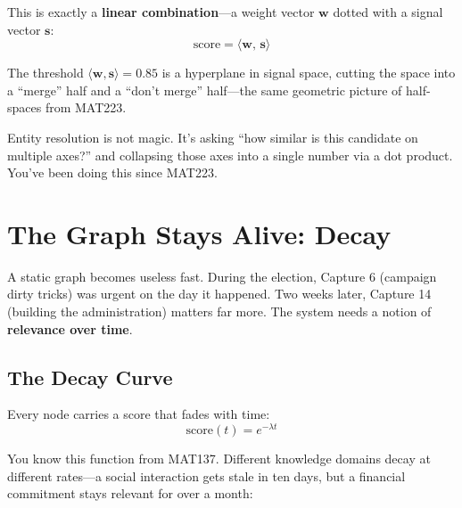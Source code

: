 \documentclass[11pt, letterpaper]{article}
\begin{document}
This is exactly a \textbf{linear combination}---a weight vector $\mathbf{w}$ dotted with a signal vector $\mathbf{s}$:
\[
    \text{score} = \langle \mathbf{w},\, \mathbf{s} \rangle
\]

The threshold $\langle \mathbf{w}, \mathbf{s} \rangle = 0.85$ is a hyperplane in signal space, cutting the space into a ``merge'' half and a ``don't merge'' half---the same geometric picture of half-spaces from MAT223.

\begin{intuition}
Entity resolution is not magic. It's asking ``how similar is this candidate on multiple axes?'' and collapsing those axes into a single number via a dot product. You've been doing this since MAT223.
\end{intuition}

\section{The Graph Stays Alive: Decay}

A static graph becomes useless fast. During the election, Capture 6 (campaign dirty tricks) was urgent on the day it happened. Two weeks later, Capture 14 (building the administration) matters far more. The system needs a notion of \textbf{relevance over time}.

\subsection{The Decay Curve}

Every node carries a score that fades with time:
\[
    \text{score}(t) = e^{-\lambda t}
\]

You know this function from MAT137. Different knowledge domains decay at different rates---a social interaction gets stale in ten days, but a financial commitment stays relevant for over a month:
\end{document}
